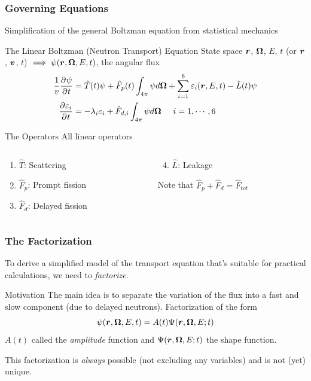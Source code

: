 \documentclass[10pt,compress]{beamer}
\begin{document}
\begin{frame}\frametitle{Governing Equations}
Simplification of the general Boltzman equation from statistical mechanics
\begin{block}{The Linear Boltzman (Neutron Transport) Equation}
    State space $\boldsymbol{r}$, $\boldsymbol{\Omega}$, $E$, $t$ (or $\boldsymbol{r}$, $\boldsymbol{v}$, $t$) $\implies \psi(\boldsymbol{r}, \boldsymbol{\Omega}, E, t)$, the angular flux
    \begin{equation}
        \begin{split}
            \frac{1}{v}\frac{\partial^{} \psi}{\partial^{} t} &= \hat{T}(t)\psi + \hat{F}_p(t) \int_{4\pi}\psi d\boldsymbol{\Omega} + \sum_{i=1}^6 \varepsilon_i(\boldsymbol{r}, E, t) - \hat{L}(t)\psi\\
            \frac{\partial^{} \varepsilon_i}{\partial^{} t} &= -\lambda_i \varepsilon_i + \hat{F}_{d,i}\int_{4\pi}\psi d\boldsymbol{\Omega}\hspace{5mm} i=1,\cdots, 6
        \end{split}
    \end{equation}
\end{block}
\begin{block}{The Operators}
    All linear operators
    \begin{columns}
        \begin{column}{5cm}
            \begin{enumerate}
                \item $\hat{T}$: Scattering
                \item $\hat{F}_p$: Prompt fission
                \item $\hat{F}_d$: Delayed fission
            \end{enumerate}
        \end{column}
        \begin{column}{5cm}
            \begin{enumerate}
                \setcounter{enumi}{3}
                \item $\hat{L}$: Leakage
            \end{enumerate}
            Note that $\hat{F}_p + \hat{F}_d = \hat{F}_{tot}$
        \end{column}
    \end{columns}
\end{block}
\end{frame}

\begin{frame}\frametitle{The Factorization}
To derive a simplified model of the transport equation that's suitable for practical calculations, we need to \emph{factorize}.
\begin{block}{Motivation}
    The main idea is to separate the variation of the flux into a fast and slow component (due to delayed neutrons). Factorization of the form
    \begin{equation}
        \psi(\boldsymbol{r}, \boldsymbol{\Omega}, E, t)=A(t)\Psi(\boldsymbol{r}, \boldsymbol{\Omega}, E; t)\nonumber
    \end{equation}
    $A(t)$ called the \emph{amplitude} function and $\Psi(\boldsymbol{r}, \boldsymbol{\Omega}, E; t)$ the shape function.
\end{block}
This factorization is \emph{always} possible (not excluding any variables) and is not (yet) unique.
\end{frame}
\end{document}
